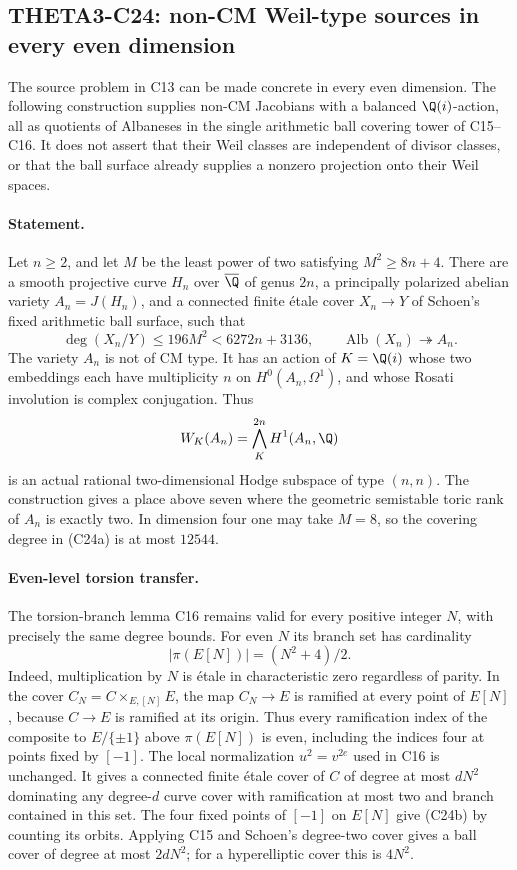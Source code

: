 \subsection{THETA3-C24: non-CM Weil-type sources in every even dimension}\label{C24}

The source problem in C13 can be made concrete in every even dimension.
The following construction supplies non-CM Jacobians with a balanced
$\Q(i)$-action, all as quotients of Albaneses in the single arithmetic
ball covering tower of C15--C16. It does not assert that their Weil
classes are independent of divisor classes, or that the ball surface
already supplies a nonzero projection onto their Weil spaces.

\paragraph{Statement.}
Let $n\geq2$, and let $M$ be the least power of two satisfying
$M^2\geq8n+4$. There are a smooth projective curve $H_n$ over
$\overline\Q$ of genus $2n$, a principally polarized abelian variety
$A_n=J(H_n)$, and a connected finite \'etale cover $X_n\to Y$ of
Schoen's fixed arithmetic ball surface, such that
\[
 \deg(X_n/Y)\leq196M^2<6272n+3136,\qquad
 \operatorname{Alb}(X_n)\twoheadrightarrow A_n.
 \tag{C24a}
\]
The variety $A_n$ is not of CM type. It has an action of $K=\Q(i)$
whose two embeddings each have multiplicity $n$ on
$H^0(A_n,\Omega^1)$, and whose Rosati involution is complex
conjugation. Thus
\[
 W_K(A_n)=\bigwedge_K^{2n}H^1(A_n,\Q)
\]
is an actual rational two-dimensional Hodge subspace of type $(n,n)$.
The construction gives a place above seven where the geometric
semistable toric rank of $A_n$ is exactly two. In dimension four
one may take $M=8$, so the covering degree in (C24a) is at most
$12544$.

\paragraph{Even-level torsion transfer.}
The torsion-branch lemma C16 remains valid for every positive integer
$N$, with precisely the same degree bounds. For even $N$ its branch
set has cardinality
\[
 |\pi(E[N])|=(N^2+4)/2.
 \tag{C24b}
\]
Indeed, multiplication by $N$ is \'etale in characteristic zero
regardless of parity. In the cover
$C_N=C\times_{E,[N]}E$, the map $C_N\to E$ is ramified at every
point of $E[N]$, because $C\to E$ is ramified at its origin.
Thus every ramification index of the composite to
$E/\{\pm1\}$ above $\pi(E[N])$ is even, including the indices
four at points fixed by $[-1]$. The local normalization
$u^2=v^{2e}$ used in C16 is unchanged. It gives a connected
finite \'etale cover of $C$ of degree at most $dN^2$ dominating
any degree-$d$ curve cover with ramification at most two and
branch contained in this set. The four fixed points of $[-1]$
on $E[N]$ give (C24b) by counting its orbits. Applying C15 and
Schoen's degree-two cover gives a ball cover of degree at most
$2dN^2$; for a hyperelliptic cover this is $4N^2$.

